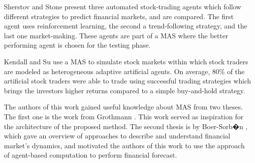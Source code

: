 \documentclass[a4paper,twoside]{article}
\begin{document}
Sherstov and Stone \cite{Sherstov2005} present three automated
stock-trading agents which follow different strategies to predict
financial markets, and are compared. The first agent uses
reinforcement learning, the second a trend-following strategy, and the
last one market-making. These agents are part of a MAS where the
better performing agent is chosen for the testing phase. 

Kendall and Su \cite{Kendall2003} use a MAS to simulate stock markets
within which stock traders are modeled as heterogeneous adaptive
artificial agents. On average, 80\% of the artificial stock traders
were able to trade using successful trading strategies which brings
the investors higher returns compared to a simple buy-and-hold
strategy. 

The authors of this work gained useful knowledge about MAS from two
theses. The first one is the work from Grothmann
\cite{Grothmann2002}. This work served as inspiration for the
architecture of the proposed method. The second thesis is by
Boer-Sorb�n \cite{Boer-Sorban2008}, which gave an overview of
approaches to describe and understand financial market's dynamics, and
motivated the authors of this work to use the approach of agent-based
computation to perform financial forecast. 




\end{document}

